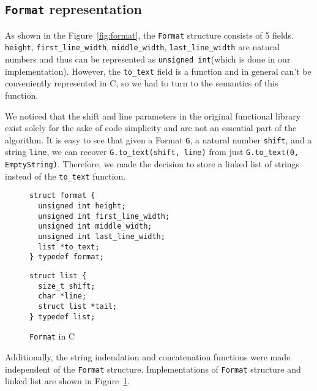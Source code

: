 \documentclass[14pt]{constructor-diploma}
\begin{document}
\subsection{\texttt{Format} representation}
As shown in the Figure~\ref{fig:format}, the \texttt{Format} structure consists of 5 fields. \texttt{height},
\texttt{first\_line\_width}, \texttt{middle\_width}, \texttt{last\_line\_width} are
natural numbers and thus can be represented as \texttt{unsigned int}(which is done in our implementation).
However, the \texttt{to\_text} field is a function and in general can't be conveniently represented in C, so
we had to turn to the semantics of this function.

We noticed that the shift and line parameters in the original functional library exist solely for the sake of code simplicity and
are not an essential part of the algorithm. 
It is easy to see that given a Format \texttt{G}, 
a natural number \texttt{shift}, and a string \texttt{line}, we can recover \texttt{G.to\_text(shift, line)}
from just \texttt{G.to\_text(0, EmptyString)}. Therefore, we made the decision to store a linked list of strings instead of the \texttt{to\_text} function. 
\begin{figure}[H]
\begin{minipage}{0.5\textwidth}

\begin{mdframed}[backgroundcolor=bg]
\begin{verbatim}
struct format {
  unsigned int height;
  unsigned int first_line_width;
  unsigned int middle_width;
  unsigned int last_line_width;
  list *to_text;
} typedef format;
\end{verbatim}
\end{mdframed}
\vspace*{-35pt}
\end{minipage}
\begin{minipage}{0.5\textwidth}

\begin{mdframed}[backgroundcolor=bg]
\begin{verbatim}
struct list {
  size_t shift;
  char *line;
  struct list *tail;
} typedef list;
\end{verbatim}
\end{mdframed}
\end{minipage}
\vspace*{30pt}
\caption{\texttt{Format} in C}
\label{fig:format_C}
\end{figure}
Additionally, the string indendation and concatenation functions were made independent of the \texttt{Format} structure.
Implementations of \texttt{Format} structure and linked list are shown in Figure~\ref{fig:format_C}.
\end{document}

